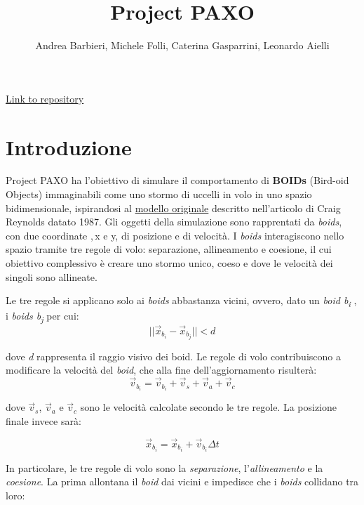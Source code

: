 \documentclass{article}
\title{\textbf{Project PAXO}}
\author{Andrea Barbieri, Michele Folli, Caterina Gasparrini, Leonardo Aielli}
\begin{document}
\maketitle
\begin{center}
\href{https://github.com/Michelefolli/Progettopaxxo}{Link to repository}
    
\end{center}

\section{Introduzione}
\label{intro}

Project PAXO ha l'obiettivo di simulare il comportamento di \textbf{BOIDs} (Bird-oid Objects) immaginabili come uno stormo di uccelli in volo in uno spazio bidimensionale, ispirandosi al \href{https://en.wikipedia.org/wiki/Boids}{modello originale} descritto nell'articolo di Craig Reynolds datato 1987. Gli oggetti della simulazione sono rapprentati da \textit{boids}, con due coordinate ,\,x e y, di posizione e di velocità. I \textit{boids} interagiscono nello spazio tramite tre regole di volo: separazione, allineamento e coesione, il cui obiettivo complessivo è creare uno stormo unico, coeso e dove le velocità dei singoli sono allineate.

Le tre regole si applicano solo ai \textit{boids} abbastanza vicini, ovvero, dato un \textit{boid b\textsubscript{i}} , i \textit{boids b\textsubscript{j}} per cui:
\smallskip
\[
 ||\vec{x}_{b_i} - \vec{x}_{b_j}|| < d 
\]

\medskip

dove \textit{d} rappresenta il raggio visivo dei boid. Le regole di volo contribuiscono a modificare la velocità del \textit{boid}, che alla fine dell'aggiornamento risulterà:
\smallskip
\[
\vec{v}_{b_i} = \vec{v}_{b_i} + \vec{v}_s + \vec{v}_a + \vec{v}_c
\]

\medskip

dove \(\vec{v}_s\), \(\vec{v}_a\) e \(\vec{v}_c\) sono le velocità calcolate secondo le tre regole. La posizione finale invece sarà:

\smallskip
\[
\vec{x}_{b_i} = \vec{x}_{b_i} + \vec{v}_{b_i} \Delta t
\]

\smallskip

In particolare, le tre regole di volo sono la \textit{separazione}, l'\textit{allineamento} e la \textit{coesione}. La prima allontana il \textit{boid} dai vicini e impedisce che i \textit{boids} collidano tra loro:
\end{document}
